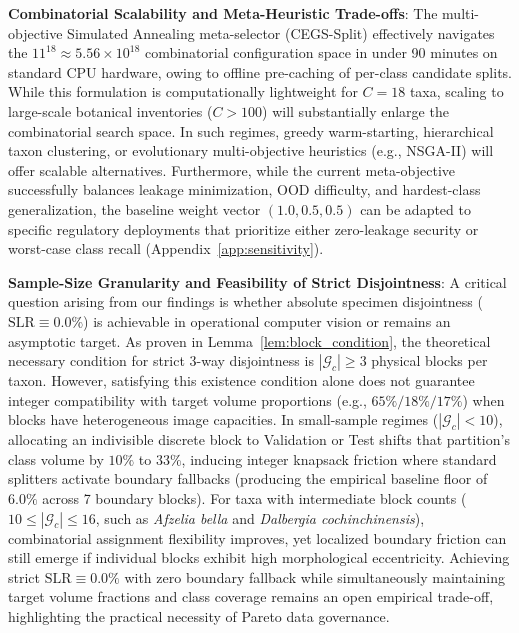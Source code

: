 \documentclass[a4paper,fleqn]{cas-sc}
\begin{document}
\textbf{Combinatorial Scalability and Meta-Heuristic Trade-offs}: The multi-objective Simulated Annealing meta-selector (CEGS-Split) effectively navigates the $11^{18} \approx 5.56 \times 10^{18}$ combinatorial configuration space in under 90 minutes on standard CPU hardware, owing to offline pre-caching of per-class candidate splits. While this formulation is computationally lightweight for $C=18$ taxa, scaling to large-scale botanical inventories ($C > 100$) will substantially enlarge the combinatorial search space. In such regimes, greedy warm-starting, hierarchical taxon clustering, or evolutionary multi-objective heuristics (e.g., NSGA-II) will offer scalable alternatives. Furthermore, while the current meta-objective successfully balances leakage minimization, OOD difficulty, and hardest-class generalization, the baseline weight vector $(1.0, 0.5, 0.5)$ can be adapted to specific regulatory deployments that prioritize either zero-leakage security or worst-case class recall (Appendix~\ref{app:sensitivity}).

\textbf{Sample-Size Granularity and Feasibility of Strict Disjointness}: A critical question arising from our findings is whether absolute specimen disjointness ($\mathrm{SLR} \equiv 0.0\%$) is achievable in operational computer vision or remains an asymptotic target. As proven in Lemma~\ref{lem:block_condition}, the theoretical necessary condition for strict 3-way disjointness is $|\mathcal{G}_c| \ge 3$ physical blocks per taxon. However, satisfying this existence condition alone does not guarantee integer compatibility with target volume proportions (e.g., $65\%/18\%/17\%$) when blocks have heterogeneous image capacities. In small-sample regimes ($|\mathcal{G}_c| < 10$), allocating an indivisible discrete block to Validation or Test shifts that partition's class volume by $10\%$ to $33\%$, inducing integer knapsack friction where standard splitters activate boundary fallbacks (producing the empirical baseline floor of $6.0\%$ across 7 boundary blocks). For taxa with intermediate block counts ($10 \le |\mathcal{G}_c| \le 16$, such as \textit{Afzelia bella} and \textit{Dalbergia cochinchinensis}), combinatorial assignment flexibility improves, yet localized boundary friction can still emerge if individual blocks exhibit high morphological eccentricity. Achieving strict $\mathrm{SLR} \equiv 0.0\%$ with zero boundary fallback while simultaneously maintaining target volume fractions and class coverage remains an open empirical trade-off, highlighting the practical necessity of Pareto data governance.
\end{document}
